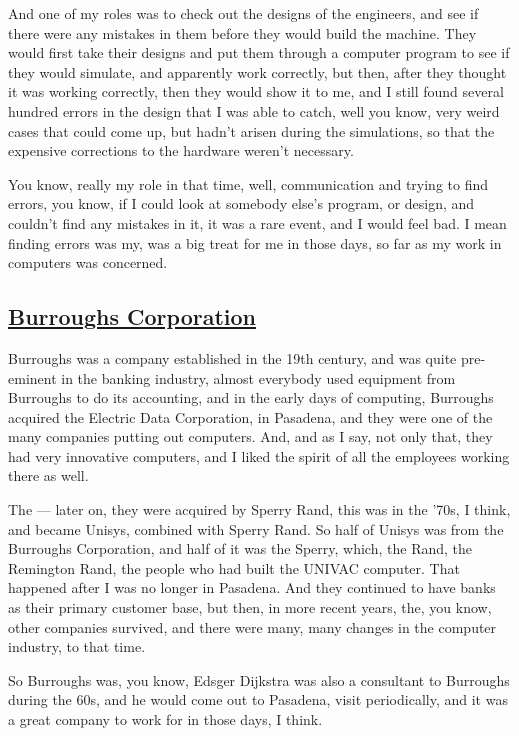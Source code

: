 \documentclass[]{article}
\begin{document}
And one of my roles was to check out the designs of the engineers, and
see if there were any mistakes in them before they would build the
machine. They would first take their designs and put them through a
computer program to see if they would simulate, and apparently work
correctly, but then, after they thought it was working correctly, then
they would show it to me, and I still found several hundred errors in
the design that I was able to catch, well you know, very weird cases
that could come up, but hadn't arisen during the simulations, so that
the expensive corrections to the hardware weren't necessary.

You know, really my role in that time, well, communication and trying to
find errors, you know, if I could look at somebody else's program, or
design, and couldn't find any mistakes in it, it was a rare event, and I
would feel bad. I mean finding errors was my, was a big treat for me in
those days, so far as my work in computers was concerned.

\subsection{\texorpdfstring{\href{http://webofstories.com/play/17088}{Burroughs
Corporation}}{Burroughs Corporation}}\label{burroughs-corporation}

Burroughs was a company established in the 19th century, and was quite
pre-eminent in the banking industry, almost everybody used equipment
from Burroughs to do its accounting, and in the early days of computing,
Burroughs acquired the Electric Data Corporation, in Pasadena, and they
were one of the many companies putting out computers. And, and as I say,
not only that, they had very innovative computers, and I liked the
spirit of all the employees working there as well.

The --- later on, they were acquired by Sperry Rand, this was in the
'70s, I think, and became Unisys, combined with Sperry Rand. So half of
Unisys was from the Burroughs Corporation, and half of it was the
Sperry, which, the Rand, the Remington Rand, the people who had built
the UNIVAC computer. That happened after I was no longer in Pasadena.
And they continued to have banks as their primary customer base, but
then, in more recent years, the, you know, other companies survived, and
there were many, many changes in the computer industry, to that time.

So Burroughs was, you know, Edsger Dijkstra was also a consultant to
Burroughs during the 60s, and he would come out to Pasadena, visit
periodically, and it was a great company to work for in those days, I
think.
\end{document}
